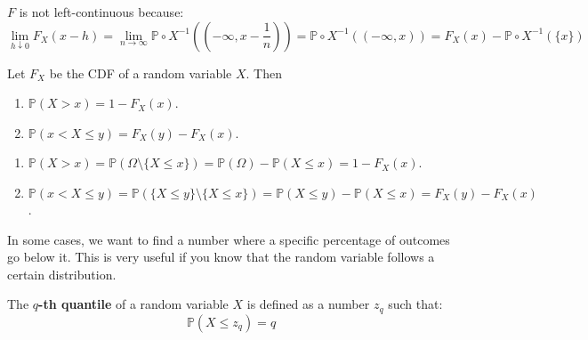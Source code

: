 \documentclass{huhtakm-template-book}
\newcommand{\prob}{\mathbb{P}}
\begin{document}
\begin{rem}
	$F$ is not left-continuous because:
	\begin{equation*}
		\lim_{h\downarrow 0}F_{X}(x-h)=\lim_{n\to\infty}\prob\circ X^{-1}\left(\left(-\infty,x-\frac{1}{n}\right)\right)=\prob\circ X^{-1}((-\infty,x))=F_{X}(x)-\prob\circ X^{-1}(\{x\})
	\end{equation*}
\end{rem}
\begin{lem}
	Let $F_{X}$ be the CDF of a random variable $X$. Then
	\begin{enumerate}
		\item $\prob(X>x)=1-F_{X}(x)$.
		\item $\prob(x<X\leq y)=F_{X}(y)-F_{X}(x)$.
	\end{enumerate}
\end{lem}
\begin{proofing}
	\begin{enumerate}
		\item $\prob(X>x)=\prob(\Omega\setminus\{X\leq x\})=\prob(\Omega)-\prob(X\leq x)=1-F_{X}(x)$.
		\item $\prob(x<X\leq y)=\prob(\{X\leq y\}\setminus\{X\leq x\})=\prob(X\leq y)-\prob(X\leq x)=F_{X}(y)-F_{X}(x)$.
	\end{enumerate}
\end{proofing}
In some cases, we want to find a number where a specific percentage of outcomes go below it. This is very useful if you know that the random variable follows a certain distribution.
\begin{defn}
	The \textbf{$q$-th quantile} of a random variable $X$ is defined as a number $z_{q}$ such that:
	\begin{equation*}
		\prob(X\leq z_{q})=q
	\end{equation*}
\end{defn}
\end{document}
